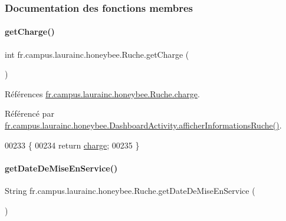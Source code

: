 \subsubsection{Documentation des fonctions membres}
\mbox{\label{classfr_1_1campus_1_1laurainc_1_1honeybee_1_1_ruche_a28fe3a64c8aaf28cf15a96a8aa37e23b}} 
\paragraph{\texorpdfstring{get\+Charge()}{getCharge()}}
{\footnotesize\ttfamily int fr.\+campus.\+laurainc.\+honeybee.\+Ruche.\+get\+Charge (\begin{DoxyParamCaption}{ }\end{DoxyParamCaption})}



Références \hyperlink{classfr_1_1campus_1_1laurainc_1_1honeybee_1_1_ruche_adf68ff1828b2eaa02c8411a9c5727bf9}{fr.\+campus.\+laurainc.\+honeybee.\+Ruche.\+charge}.



Référencé par \hyperlink{classfr_1_1campus_1_1laurainc_1_1honeybee_1_1_dashboard_activity_a88f00531bee33bd6c47b33f5ac4df9ed}{fr.\+campus.\+laurainc.\+honeybee.\+Dashboard\+Activity.\+afficher\+Informations\+Ruche()}.


\begin{DoxyCode}
00233                            \{
00234         \textcolor{keywordflow}{return} \hyperlink{classfr_1_1campus_1_1laurainc_1_1honeybee_1_1_ruche_adf68ff1828b2eaa02c8411a9c5727bf9}{charge};
00235     \}
\end{DoxyCode}
\mbox{\label{classfr_1_1campus_1_1laurainc_1_1honeybee_1_1_ruche_a91d42ceda1aed3eb0eb39c013f62a149}} 
\paragraph{\texorpdfstring{get\+Date\+De\+Mise\+En\+Service()}{getDateDeMiseEnService()}}
{\footnotesize\ttfamily String fr.\+campus.\+laurainc.\+honeybee.\+Ruche.\+get\+Date\+De\+Mise\+En\+Service (\begin{DoxyParamCaption}{ }\end{DoxyParamCaption})}




